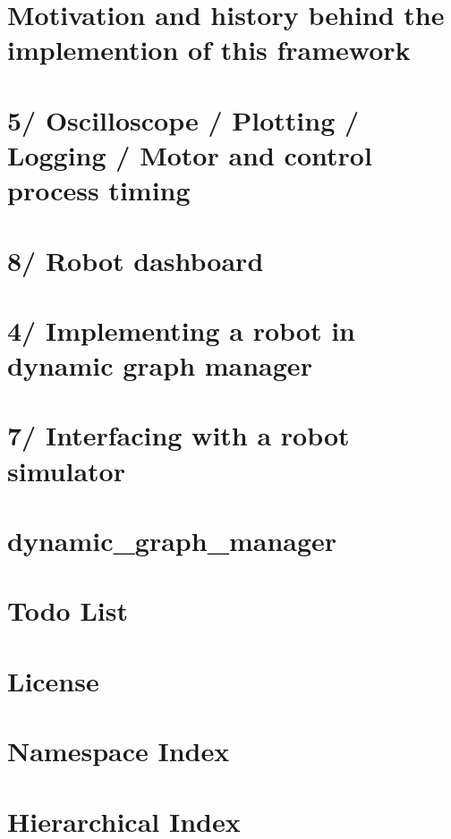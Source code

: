 \documentclass[twoside]{book}
\newcommand{\+}{\discretionary{\mbox{\scriptsize$\hookleftarrow$}}{}{}}
\begin{document}
\chapter{Motivation and history behind the implemention of this framework}
\label{subpage_motivation_history}
\hypertarget{subpage_motivation_history}{}

\chapter{5/ Oscilloscope / Plotting / Logging / Motor and control process timing}
\label{subpage_plot}
\hypertarget{subpage_plot}{}

\chapter{8/ Robot dashboard}
\label{subpage_robot_dashboard}
\hypertarget{subpage_robot_dashboard}{}

\chapter{4/ Implementing a robot in dynamic graph manager}
\label{subpage_robot_properties}
\hypertarget{subpage_robot_properties}{}

\chapter{7/ Interfacing with a robot simulator}
\label{subpage_robot_simulation}
\hypertarget{subpage_robot_simulation}{}

\chapter{dynamic\+\_\+graph\+\_\+manager}
\label{md_readme}
\hypertarget{md_readme}{}

\chapter{Todo List}
\label{todo}
\hypertarget{todo}{}

\chapter{License}
\label{license}
\hypertarget{license}{}

\chapter{Namespace Index}

\chapter{Hierarchical Index}

\end{document}
